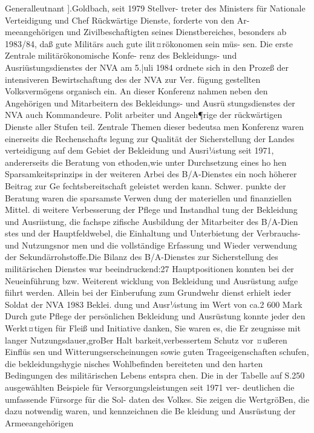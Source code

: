 Generalleutnant ].Goldbach, seit 1979 Stellver-
treter des Ministers für Nationale Verteidigung und
Chef Rückwärtige Dienste, forderte von den Ar-
meeangehörigen und Zivilbeschaftigten seines
Dienstbereiches, besonders ab 1983/84, daß gute
Militärs auch gute ilit¤rökonomen sein müs-
sen.
Die erste Zentrale militärökonomische Konfe-
renz des Bekleidungs- und Ausriüstungsdienstes der
NVA am 5.|uli 1984 ordnete sich in den Prozeß der
intensiveren Bewirtschaftung des der NVA zur Ver.
fügung gestellten Volksvermögens organisch ein.
An dieser Konferenz nahmen neben den Angehörigen und Mitarbeitern des Bekleidungs- und Ausrü
stungsdienstes der NVA auch Kommandeure. Polit
arbeiter und Angeh¶rige der rückwärtigen Dienste
aller Stufen teil. Zentrale Themen dieser bedeutsa
men Konferenz waren einerseits die Rechenschafts
legung zur Qualität der Sicherstellung der Landes
verteidigung auf dem Gebiet der Bekleidung und
Ausri¼stung seit 1971, andererseits die Beratung
von ethoden,wie unter Durchsetzung eines ho
hen Sparsamkeitsprinzips in der weiteren Arbei
des B/A-Dienstes ein noch höherer Beitrag zur Ge
fechtsbereitschaft geleistet werden kann. Schwer.
punkte der Beratung waren die sparsamste Verwen
dung der materiellen und finanziellen Mittel. di
weitere Verbesserung der Pflege und Instandhal
tung der Bekleidung und Ausriistung, die fachspe
zifische Ausbildung der Mitarbeiter des B/A-Dien
stes und der Hauptfeldwebel, die Einhaltung und
Unterbietung der Verbrauchs- und Nutzungsnor
men und die vollständige Erfassung und Wieder
verwendung der Sekundärrohstoffe.Die Bilanz des
B/A-Dienstes zur Sicherstellung des militärischen
Dienstes war beeindruckend:27 Hauptpositionen
konnten bei der Neueinführung bzw. Weiterent
wicklung von Bekleidung und Ausrüstung aufge
fiihrt werden.
Allein bei der Einberufung zum Grundwehr
dienst erhielt ieder Soldat der NVA 1983 Beklei.
dung und Ausr¼stung im Wert von ca.2 600 Mark
Durch gute Pflege der persönlichen Bekleidung
und Ausrüstung konnte jeder den Werkt¤tigen für
Fleiß und Initiative danken, Sie waren es, die Er
zeugnisse mit langer Nutzungsdauer,groBer Halt
barkeit,verbessertem Schutz vor ¤ußeren Einflüs
sen und Witterungserscheinungen sowie guten
Trageeigenschaften schufen, die bekleidungshygie
nisches Wohlbefinden bereiteten und den harten
Bedingungen des militärischen Lebens entspra
chen.
Die in der Tabelle auf S.250 ausgewählten
Beispiele für Versorgungsleistungen seit 1971 ver-
deutlichen die umfassende Fürsorge für die Sol-
daten des Volkes. Sie zeigen die WertgröBen, die dazu notwendig waren, und kennzeichnen die Be
kleidung und Ausrüstung der Armeeangehörigen
